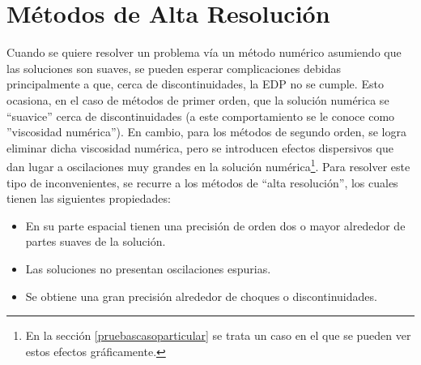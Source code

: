\documentclass[11pt,twoside,openright,spanish]{report}
\numberwithin{equation}{chapter}
\numberwithin{figure}{chapter}
\numberwithin{table}{chapter}
\begin{document}
\section{Métodos de Alta Resolución}
\noindent
Cuando se quiere resolver un problema vía un método numérico asumiendo que las soluciones son suaves, se pueden esperar complicaciones debidas principalmente a que, cerca de discontinuidades, la EDP no se cumple. Esto ocasiona, en el caso de métodos de primer orden, que la solución numérica se ``suavice'' cerca de discontinuidades (a este comportamiento se le conoce como ''viscosidad numérica''). En cambio, para los métodos de segundo orden, se logra eliminar dicha viscosidad numérica, pero se introducen efectos dispersivos que dan lugar a oscilaciones muy grandes en la solución numérica\footnote{En la sección \ref{pruebascasoparticular} se trata un caso en el que se pueden ver estos efectos gráficamente.}. Para resolver este tipo de inconvenientes, se recurre a los métodos de ``alta resolución'', los cuales tienen las siguientes propiedades:
\begin{itemize}
	\item En su parte espacial tienen una precisión de orden dos o mayor alrededor de partes suaves de la solución.
	\item Las soluciones no presentan oscilaciones espurias.
	\item Se obtiene una gran precisión alrededor de choques o discontinuidades.
\end{itemize}

\end{document}
